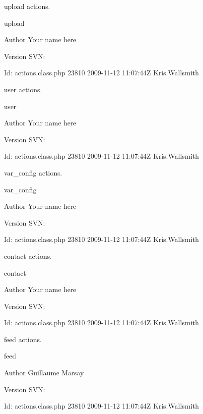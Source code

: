 upload actions.

upload \begin{DoxyAuthor}{Author}
Your name here 
\end{DoxyAuthor}
\begin{DoxyVersion}{Version}
S\-V\-N\-: 
\end{DoxyVersion}
\begin{DoxyParagraph}{Id\-:}
actions.\-class.\-php 23810 2009-\/11-\/12 11\-:07\-:44\-Z Kris.\-Wallsmith 
\end{DoxyParagraph}


user actions.

user \begin{DoxyAuthor}{Author}
Your name here 
\end{DoxyAuthor}
\begin{DoxyVersion}{Version}
S\-V\-N\-: 
\end{DoxyVersion}
\begin{DoxyParagraph}{Id\-:}
actions.\-class.\-php 23810 2009-\/11-\/12 11\-:07\-:44\-Z Kris.\-Wallsmith 
\end{DoxyParagraph}


var\-\_\-config actions.

var\-\_\-config \begin{DoxyAuthor}{Author}
Your name here 
\end{DoxyAuthor}
\begin{DoxyVersion}{Version}
S\-V\-N\-: 
\end{DoxyVersion}
\begin{DoxyParagraph}{Id\-:}
actions.\-class.\-php 23810 2009-\/11-\/12 11\-:07\-:44\-Z Kris.\-Wallsmith 
\end{DoxyParagraph}


contact actions.

contact \begin{DoxyAuthor}{Author}
Your name here 
\end{DoxyAuthor}
\begin{DoxyVersion}{Version}
S\-V\-N\-: 
\end{DoxyVersion}
\begin{DoxyParagraph}{Id\-:}
actions.\-class.\-php 23810 2009-\/11-\/12 11\-:07\-:44\-Z Kris.\-Wallsmith 
\end{DoxyParagraph}


feed actions.

feed \begin{DoxyAuthor}{Author}
Guillaume Marsay 
\end{DoxyAuthor}
\begin{DoxyVersion}{Version}
S\-V\-N\-: 
\end{DoxyVersion}
\begin{DoxyParagraph}{Id\-:}
actions.\-class.\-php 23810 2009-\/11-\/12 11\-:07\-:44\-Z Kris.\-Wallsmith 
\end{DoxyParagraph}


